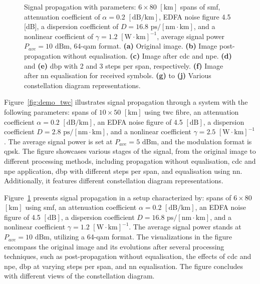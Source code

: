 \begin{landscape}
\begin{figure}[htpb]
\begin{minipage}[h]{0.45\linewidth}
\begin{minipage}[h]{0.49\linewidth}
{        }
        \end{minipage}
    \end{minipage}
    \caption{Signal propagation with parameters: $6 \times 80$ $[\textrm{km}]$ spans of \gls{smf}, attenuation coefficient of $\alpha = 0.2$ $[\textrm{dB}/\textrm{km}]$, EDFA noise figure 4.5 \textrm{[dB]}, a dispersion coefficient of $D = 16.8$ $\textrm{ps}/[\textrm{nm} \cdot \textrm{km}]$, and a nonlinear coefficient of $\gamma = 1.2$ $[\textrm{W} \cdot \textrm{km}]^{-1}$, average signal power $P_{ave} = 10$ $\textrm{dBm}$, 64-\gls{qam} format. \textbf{(a)} Original image. \textbf{(b)} Image post-propagation without equalisation. \textbf{(c)} Image after \gls{cdc} and \gls{npe}. \textbf{(d)} and \textbf{(e)} \gls{dbp} with 2 and 3 steps per span, respectively. \textbf{(f)} Image after \gls{nn} equalisation for received symbols. \textbf{(g)} to \textbf{(j)} Various constellation diagram representations.}
    \label{fig:demo_smf}
\end{figure}
\end{landscape}


Figure~\ref{fig:demo_twc} illustrates signal propagation through a system with the following parameters: spans of $10 \times 50$ $[\textrm{km}]$ using \gls{twc} fibre, an attenuation coefficient $\alpha = 0.2$ $[\textrm{dB}/\textrm{km}]$, an EDFA noise figure of 4.5 $[\textrm{dB}]$, a dispersion coefficient $D = 2.8$ $\textrm{ps}/[\textrm{nm} \cdot \textrm{km}]$, and a nonlinear coefficient $\gamma = 2.5$ $[\textrm{W} \cdot \textrm{km}]^{-1}$. The average signal power is set at $P_{ave} = 5$ $\textrm{dBm}$, and the modulation format is \gls{qpsk}. The figure showcases various stages of the signal, from the original image to different processing methods, including propagation without equalisation, \gls{cdc} and \gls{npe} application, \gls{dbp} with different steps per span, and equalisation using \gls{nn}. Additionally, it features different constellation diagram representations.


Figure~\ref{fig:demo_smf} presents signal propagation in a setup characterized by: spans of $6 \times 80$ $[\textrm{km}]$ using \gls{smf}, an attenuation coefficient $\alpha = 0.2$ $[\textrm{dB}/\textrm{km}]$, an EDFA noise figure of 4.5 $[\textrm{dB}]$, a dispersion coefficient $D = 16.8$ $\textrm{ps}/[\textrm{nm} \cdot \textrm{km}]$, and a nonlinear coefficient $\gamma = 1.2$ $[\textrm{W} \cdot \textrm{km}]^{-1}$. The average signal power stands at $P_{ave} = 10$ $\textrm{dBm}$, utilizing a 64-\gls{qam} format. The visualizations in the figure encompass the original image and its evolutions after several processing techniques, such as post-propagation without equalisation, the effects of \gls{cdc} and \gls{npe}, \gls{dbp} at varying steps per span, and \gls{nn} equalisation. The figure concludes with different views of the constellation diagram.




